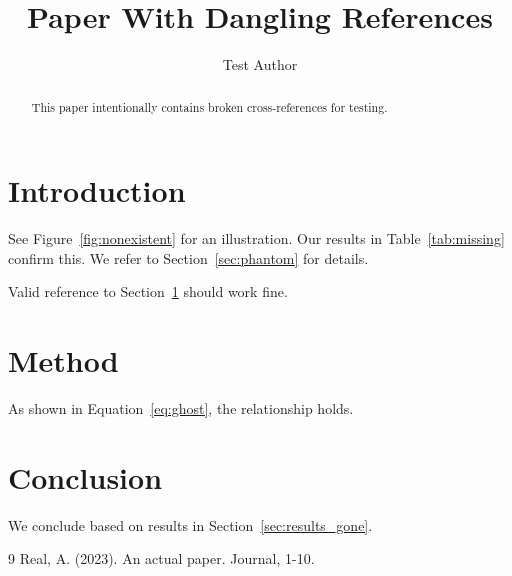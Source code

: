 \documentclass{article}
\title{Paper With Dangling References}
\author{Test Author}
\begin{document}
\maketitle

\begin{abstract}
This paper intentionally contains broken cross-references for testing.
\end{abstract}

\section{Introduction}
\label{sec:intro}

See Figure~\ref{fig:nonexistent} for an illustration.
Our results in Table~\ref{tab:missing} confirm this.
We refer to Section~\ref{sec:phantom} for details.

Valid reference to Section~\ref{sec:intro} should work fine.

\section{Method}
\label{sec:method}

As shown in Equation~\ref{eq:ghost}, the relationship holds.

\section{Conclusion}

We conclude based on results in Section~\ref{sec:results_gone}.

\begin{thebibliography}{9}
 Real, A. (2023). An actual paper. Journal, 1-10.
\end{thebibliography}
\end{document}
